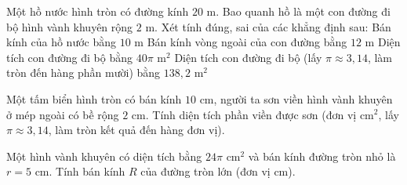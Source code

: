 \begin{ex}%
	Một hồ nước hình tròn có đường kính $20\text{ m}$. Bao quanh hồ là một con đường đi bộ hình vành khuyên rộng $2\text{ m}$. Xét tính đúng, sai của các khẳng định sau:
	\choiceTF
	{\True Bán kính của hồ nước bằng $10\text{ m}$}
	{\True Bán kính vòng ngoài của con đường bằng $12\text{ m}$}
	{Diện tích con đường đi bộ bằng $40\pi\text{ m}^2$}
	{\True Diện tích con đường đi bộ (lấy $\pi \approx 3{,}14$, làm tròn đến hàng phần mười) bằng $138{,}2\text{ m}^2$}
\end{ex}

\begin{bt}%
	Một tấm biển hình tròn có bán kính $10\text{ cm}$, người ta sơn viền hình vành khuyên ở mép ngoài có bề rộng $2\text{ cm}$. Tính diện tích phần viền được sơn (đơn vị $\text{cm}^2$, lấy $\pi \approx 3{,}14$, làm tròn kết quả đến hàng đơn vị).
\end{bt}

\begin{bt}%
	Một hình vành khuyên có diện tích bằng $24\pi\text{ cm}^2$ và bán kính đường tròn nhỏ là $r = 5\text{ cm}$. Tính bán kính $R$ của đường tròn lớn (đơn vị cm).
\end{bt}
